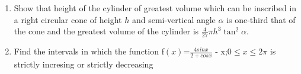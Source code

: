 \documentclass[12pt,-letter paper]{article}
\providecommand{\brak}[1]{\ensuremath{\left(#1\right)}}
\begin{document}
\begin{enumerate}
       \item Show that height of the cylinder of greatest volume which can be inscribed in a right circular cone of height $h$ and semi-vertical angle $\alpha$ is one-third that of  the cone and the greatest volume of the cylinder is $\frac {4} {27} \pi h^3 \tan^2 \alpha $. 
        \item Find the intervals in which the function  f\brak{x}=$ \frac {4sinx} {2+cosx} $ - x;$0 \leq x \leq 2 \pi$ is strictly incresing or strictly decreasing  
              
\end{enumerate}
\end{document}

